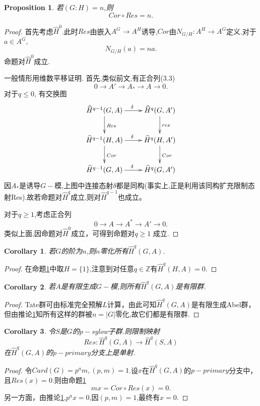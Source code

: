\documentclass[UTF8]{article}
\newtheorem{cor}{Corollary}[section]
\newtheorem{prop}{Proposition}[section]
\begin{document}
\begin{prop}\label{prop:Cor-Res}
	若$(G:H)=n$,则
	$$
	Cor\circ Res=n.
	$$
\end{prop}
\begin{proof}
	首先考虑$\widehat{H}^{0}$.此时$Res$由嵌入$A^{G}\rightarrow A^{H}$诱导,$Cor$由$N_{G/H}:A^{H}\rightarrow A^{G}$定义.对于$a\in A^{G},$ $$N_{G/H}(a)=na.$$
	命题对$\widehat{H}^{0}$成立.
	
	一般情形用维数平移证明.
	首先,类似前文,有正合列(3.3)
	$$
	0\rightarrow A'\rightarrow A_{*}\rightarrow A\rightarrow 0.
	$$
	对于$q\leq 0$,
	有交换图
$$
\xymatrix{
\widehat{H}^{q-1}(G,A)\ar[r]^{\delta}\ar[d]^{Res}&\widehat{H}^{q}(G,A')\ar[d]^{res}\\
\widehat{H}^{q-1}(H,A)\ar[r]^{\delta}\ar[d]^{Cor}&\widehat{H}^{q}(H,A')\ar[d]^{Cor}\\
\widehat{H}^{q-1}(G,A)\ar[r]^{\delta}&\widehat{H}^{q}(G,A')
}
$$
因$A_{*}$是诱导$G-$模,上图中连接态射$\delta$都是同构(事实上,正是利用该同构扩充限制态射Res).故若命题对$\widehat{H}^{q}$成立,则对$\widehat{H}^{q-1}$也成立。
	
	对于$q\geq 1$,考虑正合列
	$$
	0\rightarrow A\rightarrow A^{*}\rightarrow A'\rightarrow 0.
	$$
	类似上面,因命题对$\widehat{H}^{0}$成立，可得到命题对$q\geq 1$ 成立.
\end{proof}
\begin{cor}\label{cor:annihiliated}
	若$G$的阶为$n$,则$n$零化所有$\widehat{H}^{q}(G,A)$.
\end{cor}
\begin{proof}
	在命题\ref{prop:Cor-Res}中取$H=\{1\}$,注意到对任意$q\in \mathbb{Z}$有$\widehat{H}^{q}(H,A)=0$.
\end{proof}
\begin{cor}
	若$A$是有限生成$G-$模,则所有$\widehat{H}^{q}(G,A)$是有限群.
\end{cor}
\begin{proof}
	Tate群可由标准完全预解$L$计算，由此可知$\widehat{H}^{q}(G,A)$是有限生成Abel群，但由推论\ref{cor:annihiliated}知所有这样的群被$n=|G|$零化,故它们都是有限群.
\end{proof}
\begin{cor}\label{cor:Res is mono}
	令$S$是$G$的$p-$sylow子群.则限制映射
	$$
	Res:\widehat{H}^{q}(G,A)\rightarrow \widehat{H}^{q}(S,A)
	$$
	在$\widehat{H}^{q}(G,A)$的$p-primary$分支上是单射.
\end{cor}
\begin{proof}
令$Card(G)=p^{a}m,(p,m)=1$.设$x$在$\widehat{H}^{q}(G,A)$的$p-primary$分支中，且$Res(x)=0.$则由命题\ref{prop:Cor-Res}$$
mx=Cor\circ Res(x)=0.
$$
另一方面，由推论\ref{cor:annihiliated},$p^{a}x=0$,因$(p,m)=1$,最终有$x=0$.
\end{proof}
\end{document}
